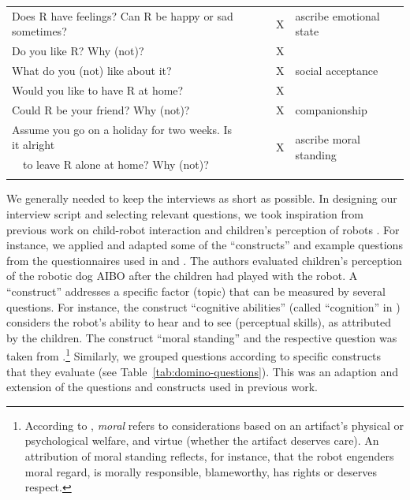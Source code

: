 \documentclass{sig-alternate}
\begin{document}
\begin{table}[h]
\begin{tabular}{lcccl}
	Does R have feelings? Can R be happy or sad sometimes? & & & X & ascribe emotional state \\
\noalign{\smallskip} \hline \noalign{\smallskip}	
	
	Do you like R? Why (not)? & & & X & \multirow{3}{*}{social acceptance} \\
	What do you (not) like about it? & & & X & \\
	Would you like to have R at home? & & & X & \\	
\noalign{\smallskip} \hline \noalign{\smallskip}	
	
	Could R be your friend? Why (not)? & & & X & companionship\\
\noalign{\smallskip} \hline \noalign{\smallskip}		
	
	Assume you go on a holiday for two weeks. Is it alright & & & \multirow{2}{*}{X} & \multirow{2}{*}{ascribe moral standing}\\
	~~to leave R alone at home? Why (not)? & & &  & \\	
\noalign{\smallskip}\hline

\end{tabular}
\end{table}		

We generally needed to keep the interviews as short as possible. In designing
our interview script and selecting relevant questions, we took inspiration from
previous work on child-robot interaction and children's perception of robots
\cite{kahn_jr._robotic_2006,weiss_i_2009,leite_influence_2013}. For instance, we
applied and adapted some of the ``constructs'' and example questions from the
questionnaires used in \cite{kahn_jr._robotic_2006} and \cite{weiss_i_2009}. The
authors evaluated children's perception of the robotic dog AIBO after the
children had played with the robot. A ``construct'' addresses a specific factor
(topic) that can be measured by several questions. For instance, the construct
``cognitive abilities'' (called ``cognition'' in \cite{weiss_i_2009}) considers
the robot's ability to hear and to see (perceptual skills), as attributed by the
children. The construct ``moral standing'' and the respective question was taken
from \cite{kahn_jr._robotic_2006}.\footnote{According to
\cite{kahn_jr._robotic_2006}, \textit{moral} refers to considerations based on
an artifact's physical or psychological welfare, and virtue (whether the
artifact deserves care). An attribution of moral standing reflects, for
instance, that the robot engenders moral regard, is morally responsible,
blameworthy, has rights or deserves respect.}			Similarly, we grouped
questions according to specific constructs that they evaluate (see
Table~\ref{tab:domino-questions}). This was an adaption and extension of the
questions and constructs used in previous work.\\
\end{document}
